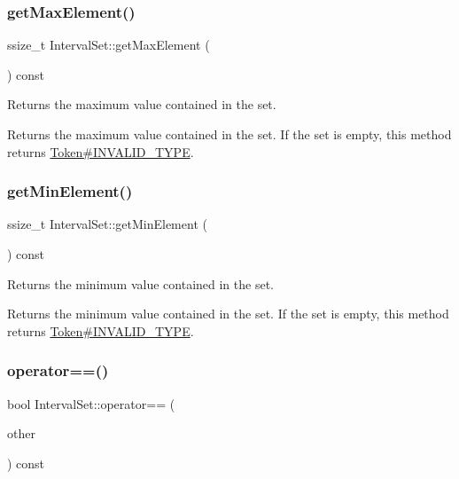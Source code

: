 \subsubsection{\texorpdfstring{get\+Max\+Element()}{getMaxElement()}}
{\footnotesize\ttfamily ssize\+\_\+t Interval\+Set\+::get\+Max\+Element (\begin{DoxyParamCaption}{ }\end{DoxyParamCaption}) const}

Returns the maximum value contained in the set.

\begin{DoxyReturn}{Returns}
the maximum value contained in the set. If the set is empty, this method returns \hyperlink{}{Token\#\+I\+N\+V\+A\+L\+I\+D\+\_\+\+T\+Y\+PE}. 
\end{DoxyReturn}
\mbox{\label{classantlr4_1_1misc_1_1IntervalSet_ac56d5b4e2b0d420e15cfc33f2cbeec6e}} 
\subsubsection{\texorpdfstring{get\+Min\+Element()}{getMinElement()}}
{\footnotesize\ttfamily ssize\+\_\+t Interval\+Set\+::get\+Min\+Element (\begin{DoxyParamCaption}{ }\end{DoxyParamCaption}) const}

Returns the minimum value contained in the set.

\begin{DoxyReturn}{Returns}
the minimum value contained in the set. If the set is empty, this method returns \hyperlink{}{Token\#\+I\+N\+V\+A\+L\+I\+D\+\_\+\+T\+Y\+PE}. 
\end{DoxyReturn}
\mbox{\label{classantlr4_1_1misc_1_1IntervalSet_a47ad0522ad659ed9b80d16ada050390c}} 
\subsubsection{\texorpdfstring{operator==()}{operator==()}}
{\footnotesize\ttfamily bool Interval\+Set\+::operator== (\begin{DoxyParamCaption}\item[{const \hyperlink{classantlr4_1_1misc_1_1IntervalSet}{Interval\+Set} \&}]{other }\end{DoxyParamCaption}) const}

